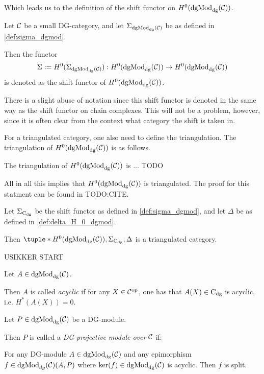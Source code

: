 Which leads us to the definition of the shift functor on \( H^0(\operatorname{dgMod}_{\operatorname{dg}}({\mathcal{C}})) \).

\begin{definition}
    \label{def:sigma_h_0_dgmod}
    Let \( {\mathcal{C}} \) be a small DG-category, and let \( \Sigma_{\operatorname{dgMod}_{\operatorname{dg}}({\mathcal{C}})} \) be as defined in \autoref{def:sigma_dgmod}.

    Then the functor
    \[
        \Sigma := H^0(\Sigma_{\operatorname{dgMod}_{\operatorname{dg}}({\mathcal{C}})}): H^0(\operatorname{dgMod}_{\operatorname{dg}}({\mathcal{C}})) \to H^0(\operatorname{dgMod}_{\operatorname{dg}}({\mathcal{C}}))
    \]
    is denoted as the shift functor of \( H^0(\operatorname{dgMod}_{\operatorname{dg}}({\mathcal{C}})) \).
\end{definition}

There is a slight abuse of notation since this shift functor is denoted in the same way as the shift functor on chain complexes. This will not be a problem, however, since it is often clear from the context what category the shift is taken in.

For a triangulated category, one also need to define the triangulation. The triangulation of \( H^0(\operatorname{dgMod}_{\operatorname{dg}}({\mathcal{C}})) \) is as follows.
\begin{definition}
    \label{def:delta_H_0_dgmod}
    The triangulation of \( H^0(\operatorname{dgMod}_{\operatorname{dg}}({\mathcal{C}})) \) is ... TODO
\end{definition}

All in all this implies that \( H^0(\operatorname{dgMod}_{\operatorname{dg}}({\mathcal{C}})) \) is triangulated. The proof for this statment can be found in TODO:CITE.
\begin{theorem}
    Let \( \Sigma_{\operatorname{C}_{\operatorname{dg}}} \) be the shift functor as defined in \autoref{def:sigma_dgmod}, and let \( \Delta \) be as defined in \autoref{def:delta_H_0_dgmod}.

    Then \( \tuple*{H^0(\dgMod_{\dg}(\Cc)), \Sigma_{\C_{\dg}}, \Delta} \) is a triangulated category.
\end{theorem}

USIKKER START

\begin{definition}
    Let \( A \in \operatorname{dgMod}_{\operatorname{dg}}({\mathcal{C}}) \).

    Then \( A \) is called \emph{acyclic} if for any \( X \in {\mathcal{C}}^{\operatorname{op}} \), one has that \( A(X) \in \operatorname{C}_{\operatorname{dg}} \) is acyclic, i.e. \( H^*(A(X)) = 0 \).
\end{definition}

\begin{definition}
    Let \( P \in \operatorname{dgMod}_{\operatorname{dg}}({\mathcal{C}}) \) be a DG-module.

    Then \( P \) is called a \emph{DG-projective module over \( {\mathcal{C}} \)} if:
    
    For any DG-module \( A \in \operatorname{dgMod}_{\operatorname{dg}}({\mathcal{C}}) \) and any epimorphism \( f \in \operatorname{dgMod}_{dg}({\mathcal{C}})(A, P) \) where \( \ker(f) \in \operatorname{dgMod}_{\operatorname{dg}}({\mathcal{C}}) \) is acyclic. Then \( f \) is split.
\end{definition}

